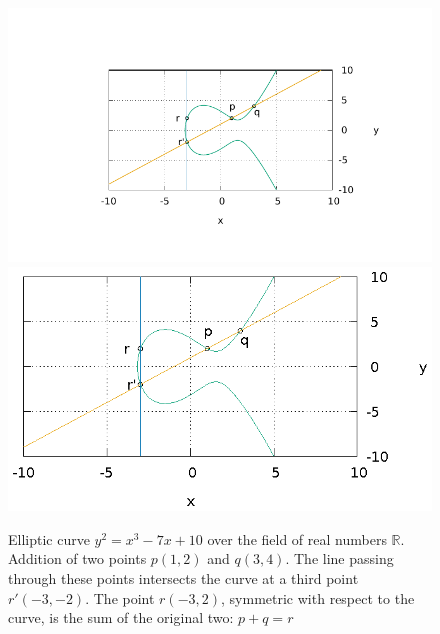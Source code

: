 \begin{figure}
\centering
\ifpdf
\includegraphics[angle=0,scale=1.5]
{./add/discretmath/picellipticsum.pdf}
\else
\includegraphics[angle=0,scale=1.5]
{./add/discretmath/picellipticsum.eps}
\fi
\caption{Elliptic curve $y^2 = x^3 -7 x + 10$ over the field
  of real numbers $\mathbb{R}$. Addition of two points $p(1,2)$ and
  $q(3,4)$. The line passing through these points intersects the curve at
  a third point $r'(-3,-2)$. The point $r(-3,2)$, symmetric with respect to the curve,
  is the sum of the original two: $p + q = r$}
\label{fig:add:ellipticRsum}
\end{figure}